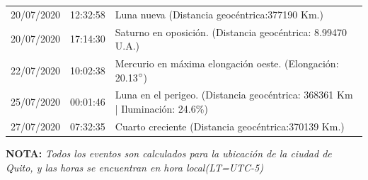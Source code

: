 \documentclass[12pt,a4paper,oneside]{article}
\begin{document}
\begin{center}
\begin{tabular}{ |l| l| l| }
20/07/2020 &  12:32:58   &  Luna nueva (Distancia geocéntrica:377190 Km.)	  \\
20/07/2020 &  17:14:30   &  Saturno en oposición. (Distancia geocéntrica: 8.99470 U.A.)	  \\ 
22/07/2020 &  10:02:38   &  Mercurio en máxima elongación oeste. (Elongación: 20.13$\degree$)	  \\ 
25/07/2020 &  00:01:46   &  Luna en el perigeo. (Distancia geocéntrica: 368361 Km | Iluminación: 24.6\%)	  \\
27/07/2020 &  07:32:35   &  Cuarto creciente (Distancia geocéntrica:370139 Km.)	  \\ 
\hline
\end{tabular}
\end{center}
\vspace{1cm}
\textbf{NOTA:  }\textit{Todos los eventos son calculados para la ubicaci\'on de la ciudad de Quito, y las horas se encuentran en hora local(LT=UTC-5)}
\vspace{0.7cm}
\newpage
\end{document}
